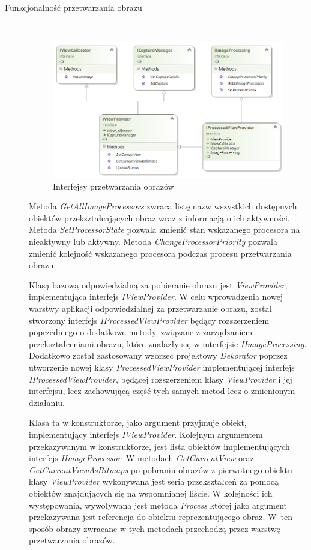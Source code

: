 \documentclass[a4paper,11pt,twoside]{report}
\theoremstyle{definition}
\begin{document}
\begin{description}

\item [Funkcjonalność przetwarzania obrazu] \hfill \\
\begin{figure}[h]
\centering
\includegraphics[scale=0.9]{images/IProcessedViewProvider}
\caption[Przetwarzanie diagram]{Interfejsy przetwarzania obrazów}
\end{figure}

Metoda \textit{GetAllImageProcessors} zwraca listę nazw wszystkich dostępnych obiektów przekształcających obraz wraz z informacją o ich aktywności.
Metoda \textit{SetProcessorState} pozwala zmienić stan wskazanego procesora na nieaktywny lub aktywny.
Metoda \textit{ChangeProcessorPriority} pozwala zmienić kolejność wskazanego procesora podczas procesu przetwarzania obrazu. 

Klasą bazową odpowiedzialną za pobieranie obrazu jest \textit{ViewProvider}, implementująca interfejs \textit{IViewProvider}. W celu wprowadzenia nowej warstwy aplikacji odpowiedzialnej za przetwarzanie obrazu, został stworzony interfejs \textit{IProcessedViewProvider} będący rozszerzeniem poprzedniego o dodatkowe metody, związane z zarządzaniem przekształceniami obrazu, które znalazły się w interfejsie \textit{IImageProcessing}. Dodatkowo został zastosowany wzorzec projektowy \textit{Dekorator} poprzez utworzenie nowej klasy \textit{ProcessedViewProvider} implementującej interfejs \textit{IProcessedViewProvider}, będącej rozszerzeniem klasy \textit{ViewProvider} i jej interfejsu, lecz zachowującą część tych samych metod lecz o zmienionym działaniu.

Klasa ta w konstruktorze, jako argument przyjmuje obiekt, implementujący interfejs \textit{IViewProvider}. Kolejnym argumentem przekazywanym w konstruktorze, jest lista obiektów implementujących interfejs \textit{IImageProcessor}. W metodach \textit{GetCurrentView} oraz \textit{GetCurrentViewAsBitmaps} po pobraniu obrazów z pierwotnego obiektu klasy \textit{ViewProvider} wykonywana jest seria przekształceń za pomocą obiektów znajdujących się na wspomnianej liście. W kolejności ich występowania, wywoływana jest metoda \textit{Process} której jako argument przekazywana jest referencja do obiektu reprezentującego obraz. W~ten sposób obrazy zwracane w tych metodach przechodzą przez warstwę przetwarzania obrazów.


\end{description}
\end{document}
